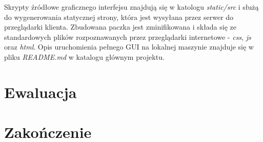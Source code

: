 \documentclass[12pt,a4paper,twoside]{mwart}
\begin{document}
Skrypty źródłowe graficznego interfejsu znajdują się w katologu \textit{static/src} i służą do wygenerowania statycznej strony, która jest wysyłana przez serwer do przeglądarki klienta. Zbudowana paczka jest zminifikowana i składa się ze standardowych plików rozpoznawanych przez przeglądarki internetowe - \textit{css}, \textit{js} oraz \textit{html}. Opis uruchomienia pełnego GUI na lokalnej maszynie znajduje się w pliku \textit{README.md} w katalogu głównym projektu.

\section{Ewaluacja} \label{sec:ewal}
\newpage
\section{Zakończenie} \label{sec:end}
\newpage
\end{document}
